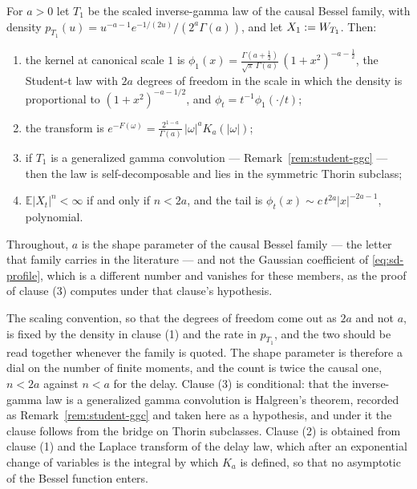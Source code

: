 \begin{proposition}\label{prop:student-t}
For $a > 0$ let $T_1$ be the scaled inverse-gamma law of the causal Bessel family, with density
$p_{T_1}(u) = u^{-a-1}e^{-1/(2u)}/(2^a\Gamma(a))$, and let $X_1 := W_{T_1}$. Then:
\begin{enumerate}
\item the kernel at canonical scale $1$ is
$\phi_1(x) = \frac{\Gamma(a+\frac12)}{\sqrt\pi\,\Gamma(a)}\,(1+x^2)^{-a-\frac12}$, the
Student-t law with $2a$ degrees of freedom in the scale in which the density is proportional to
$(1+x^2)^{-a-1/2}$, and $\phi_t = t^{-1}\phi_1(\cdot/t)$;
\item the transform is
$e^{-F(\omega)} = \frac{2^{1-a}}{\Gamma(a)}\,|\omega|^aK_a(|\omega|)$;
\item if $T_1$ is a generalized gamma convolution --- Remark~\ref{rem:student-ggc} --- then the
law is self-decomposable and lies in the symmetric Thorin subclass;
\item $\mathbb{E}|X_t|^n < \infty$ if and only if $n < 2a$, and the tail is
$\phi_t(x) \sim c\,t^{2a}|x|^{-2a-1}$, polynomial.
\end{enumerate}
Throughout, $a$ is the shape parameter of the causal Bessel family --- the letter that family
carries in the literature --- and not the Gaussian coefficient of \ref{eq:sd-profile}, which is a
different number and vanishes for these members, as the proof of clause (3) computes under that
clause's hypothesis.
\end{proposition}

The scaling convention, so that the degrees of freedom come out as $2a$ and not $a$, is fixed
by the density in clause (1) and the rate in $p_{T_1}$, and the two should be read together
whenever the family is quoted. The shape parameter is therefore a dial on the number of finite
moments, and the count is twice the causal one, $n < 2a$ against $n < a$ for the delay. Clause (3) is conditional: that the inverse-gamma law is a
generalized gamma convolution is Halgreen's theorem, recorded as
Remark~\ref{rem:student-ggc} and taken here as a hypothesis, and under it the clause follows
from the bridge on Thorin subclasses. Clause (2) is obtained from clause (1) and the Laplace
transform of the delay law, which after an exponential change of variables is the integral by
which $K_a$ is defined, so that no asymptotic of the Bessel function enters.

